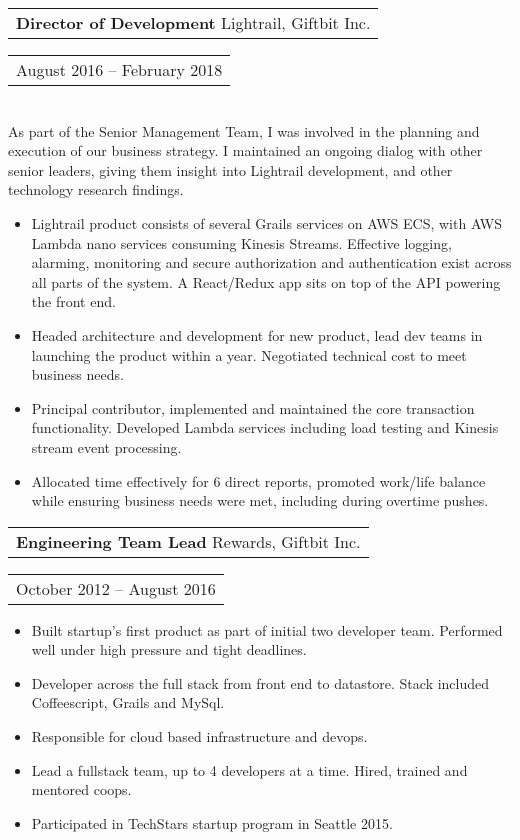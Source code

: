 \documentclass{resume}
\begin{document}
\begin{resume}
    \vspace{+0.1in}
    \begin{tabular}[t]{@{}l}
        {\bf Director of Development} Lightrail, Giftbit Inc.
    \end{tabular}\vspace{+0.05in}
    \hfill
    \begin{tabular}[t]{l@{}}
        August 2016 -- February 2018
    \end{tabular}\\
    As part of the Senior Management Team, I was involved in the planning and execution of our business strategy.
    I maintained an ongoing dialog with other senior leaders, giving them insight into Lightrail development, and other technology research findings.
    \vspace{+0.05in}
    \begin{itemize} \itemsep -2pt
    \item Lightrail product consists of several Grails services on AWS ECS, with AWS Lambda nano services consuming Kinesis Streams. Effective logging, alarming, monitoring and secure authorization and authentication exist across all parts of the system. A React/Redux app sits on top of the API powering the front end.
    \item Headed architecture and development for new product, lead dev teams in launching the product within a year. Negotiated technical cost to meet business needs.
    \item Principal contributor, implemented and maintained the core transaction functionality. Developed Lambda services including load testing and Kinesis stream event processing.
    \item Allocated time effectively for 6 direct reports, promoted work/life balance while ensuring business needs were met, including during overtime pushes.
    \end{itemize}

   \newpage

    \begin{tabular}[t]{@{}l}
        {\bf Engineering Team Lead} Rewards, Giftbit Inc.
    \end{tabular}\vspace{+0.05in}
    \hfill
    \begin{tabular}[t]{l@{}}
        October 2012 -- August 2016
    \end{tabular}
    \begin{itemize} \itemsep -2pt
    \item Built startup's first product as part of initial two developer team. Performed well under high pressure and tight deadlines.
    \item Developer across the full stack from front end to datastore. Stack included Coffeescript, Grails and MySql.
    \item Responsible for cloud based infrastructure and devops.
    \item Lead a fullstack team, up to 4 developers at a time. Hired, trained and mentored coops.
    \item Participated in TechStars startup program in Seattle 2015.
    \end{itemize}


\end{resume}
\end{document}
